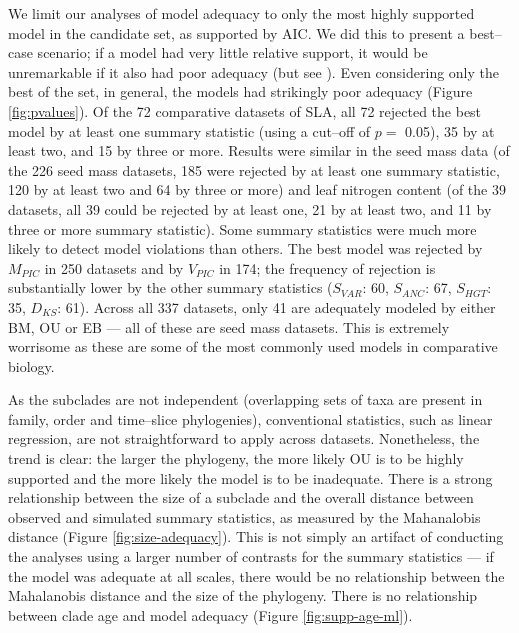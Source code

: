 \documentclass[a4paper,12pt]{article}
\begin{document}
We limit our analyses of model adequacy to only the most highly supported model in the candidate set, as supported by AIC. We did this to present a best--case scenario; if a model had very little relative support, it would be unremarkable if it also had poor adequacy (but see \citep{Ripplinger2010}). Even considering only the best of the set, in general, the models had strikingly poor adequacy (Figure \ref{fig:pvalues}). 
Of the 72 comparative datasets of SLA, all 72 rejected the best model by at least one summary statistic (using a cut--off of $p=$ 0.05), 35 by at least two, and 15 by three or more. 
Results were similar in the seed mass data (of the 226 seed mass datasets, 185 were rejected by at least one summary statistic, 120 by at least two and 64 by three or more) and leaf nitrogen content 
(of the 39 datasets, all 39 could be rejected by at least one, 21 by at least two, and 11 by three or more summary statistic). 
Some summary statistics were much more likely to detect model violations than others. The best model was rejected by $M_{PIC}$ in 250 datasets and by $V_{PIC}$ in 174; the frequency of rejection is substantially lower by the other summary statistics ($S_{VAR}$: 60, $S_{ANC}$: 67, $S_{HGT}$: 35, $D_{KS}$: 61).
Across all 337 datasets, only 41 are adequately modeled by either BM, OU or EB --- all of these are seed mass datasets. This is extremely worrisome as these are some of the most commonly used models in comparative biology. 

As the subclades are not independent (overlapping sets of taxa are present in family, order and time--slice phylogenies), conventional statistics, such as linear regression, are not straightforward to apply across datasets. Nonetheless, the trend is clear: the larger the phylogeny, the more likely OU is to be highly supported and the more likely the model is to be inadequate. There is a strong relationship between the size of a subclade and the overall distance between observed and simulated summary statistics, as measured by the Mahanalobis distance (Figure \ref{fig:size-adequacy}). This is not simply an artifact of conducting the analyses using a larger number of contrasts for the summary statistics --- if the model was adequate at all scales, there would be no relationship between the Mahalanobis distance and the size of the phylogeny. There is no relationship between clade age and model adequacy (Figure \ref{fig:supp-age-ml}).
\end{document}
